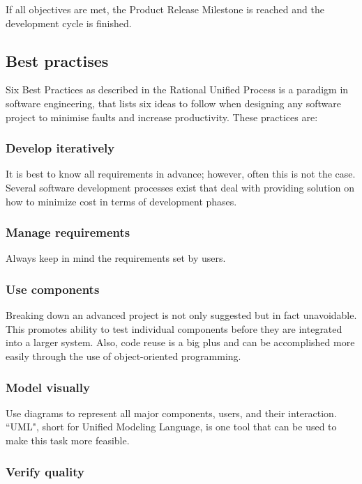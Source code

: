 If all objectives are met, the Product Release Milestone is reached and the development cycle is finished.

\subsection{Best practises}
Six Best Practices as described in the Rational Unified Process is a paradigm in software engineering, that lists six ideas to follow when designing any software project to minimise faults and increase productivity. These practices are:

\subsubsection{Develop iteratively}

It is best to know all requirements in advance; however, often this is not the case. Several software development processes exist that deal with providing solution on how to minimize cost in terms of development phases.

\subsubsection{Manage requirements}

Always keep in mind the requirements set by users.

\subsubsection{Use components}

Breaking down an advanced project is not only suggested but in fact unavoidable. This promotes ability to test individual components before they are integrated into a larger system. Also, code reuse is a big plus and can be accomplished more easily through the use of object-oriented programming.

\subsubsection{Model visually}

Use diagrams to represent all major components, users, and their interaction. ``UML", short for Unified Modeling Language, is one tool that can be used to make this task more feasible.

\subsubsection{Verify quality}

